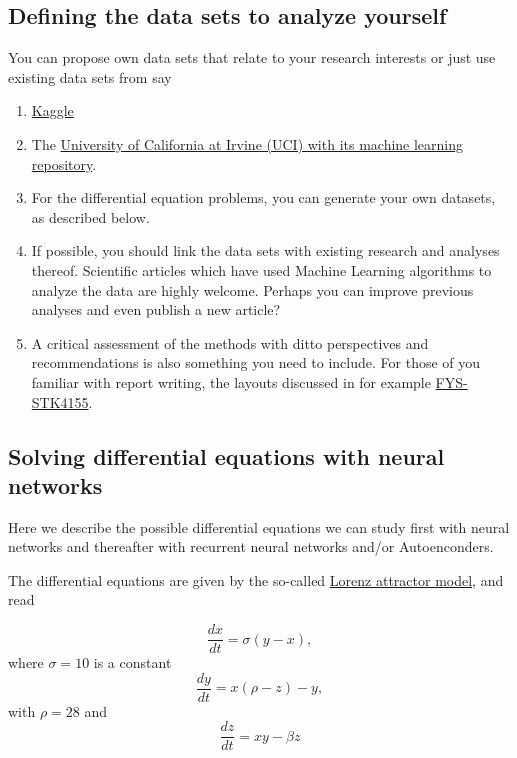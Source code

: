 \documentclass[%
oneside,                 %
final,                   %
10pt]{article}
\begin{document}
\noindent
\subsection*{Defining the data sets to analyze yourself}

You can propose own data sets that relate to your research interests or just use existing data sets from say
\begin{enumerate}
\item \href{{https://www.kaggle.com/datasets}}{Kaggle} 

\item The \href{{https://archive.ics.uci.edu/ml/index.php}}{University of California at Irvine (UCI) with its  machine learning repository}.

\item For the differential equation problems, you can generate your own datasets, as described below.

\item If possible, you should link the data sets with existing research and analyses thereof. Scientific articles which have used Machine Learning algorithms to analyze the data are highly welcome. Perhaps you can improve previous analyses and even publish a new article? 

\item A critical assessment of the methods with ditto perspectives and recommendations is also something you need to include. For those of you familiar with report writing, the layouts discussed in for example \href{{https://github.com/CompPhysics/MachineLearning/blob/master/doc/Projects/EvaluationGrading/EvaluationForm.md}}{FYS-STK4155}.
\end{enumerate}

\noindent
\subsection*{Solving  differential equations with neural networks}

Here we describe the possible differential equations we can study
first with neural networks and thereafter with recurrent neural
networks and/or Autoenconders.

The differential equations are given by the so-called \href{{https://encyclopediaofmath.org/index.php?title=Lorenz_attractor}}{Lorenz attractor model}, and read

\[
\frac{dx}{dt}=\sigma\left(y-x\right),
\]
where $\sigma =10$ is a constant
\[
\frac{dy}{dt}= x\left(\rho-z\right)-y,
\]
with $\rho=28$ and
\[
\frac{dz}{dt}=xy-\beta z
\]
\end{document}
